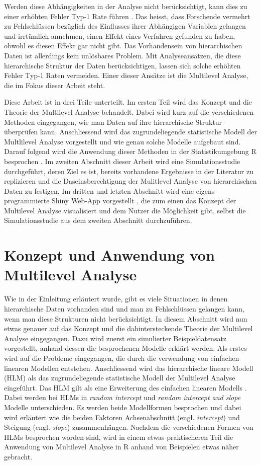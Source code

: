 \documentclass[12pt]{article}\usepackage[]{graphicx}\usepackage[]{color}
\begin{document}
Werden diese Abhängigkeiten in der Analyse nicht berücksichtigt, kann dies zu einer erhöhten Fehler Typ-1 Rate führen \citep{dorman2008effect, mcneish2014analyzing}. Das heisst, dass Forschende vermehrt zu Fehlschlüssen bezüglich des Einflusses ihrer Abhängigen Variablen gelangen und irrtümlich annehmen, einen Effekt eines Verfahren gefunden zu haben, obwohl es diesen Effekt gar nicht gibt. Das Vorhandensein von hierarchischen Daten ist allerdings kein unlösbares Problem. Mit Analyseansätzen, die diese hierarchische Struktur der Daten berücksichtigen, lassen sich solche erhöhten Fehler Typ-1 Raten vermeiden. Einer dieser Ansätze ist die Multilevel Analyse, die im Fokus dieser Arbeit steht.

Diese Arbeit ist in drei Teile unterteilt. Im ersten Teil wird das Konzept und die Theorie der Multilevel Analyse behandelt. Dabei wird kurz auf die verschiedenen Methoden eingegangen, wie man Daten auf ihre hierarchische Struktur überprüfen kann. Anschliessend wird das zugrundeliegende statistische Modell der Multlilevel Analyse vorgestellt und wie genau solche Modelle aufgebaut sind. Darauf folgend wird die Anwendung dieser Methoden in der Statistikumgebung R besprochen \citep{R}. Im zweiten Abschnitt dieser Arbeit wird eine Simulationsstudie durchgeführt, deren Ziel es ist, bereits vorhandene Ergebnisse in der Literatur zu replizieren und die Daseinsberechtigung der Mulitlevel Analyse von hierarchischen Daten zu festigen. Im dritten und letzten Abschnitt wird eine eigens programmierte Shiny Web-App vorgestellt \citep{shiny}, die zum einen das Konzept der Multilevel Analyse visualisiert und dem Nutzer die Möglichkeit gibt, selbst die Simulationsstudie aus dem zweiten Abschnitt durchzuführen. 

\section{Konzept und Anwendung von Multilevel Analyse}
Wie in der Einleitung erläutert wurde, gibt es viele Situationen in denen hierarchische Daten vorhanden sind und man zu Fehlschlüssen gelangen kann, wenn man diese Strukturen nicht berücksichtigt. In diesem Abschnitt wird nun etwas genauer auf das Konzept und die dahintersteckende Theorie der Multilevel Analyse eingegangen. Dazu wird zuerst ein simulierter Beispieldatensatz vorgestellt, anhand dessen die besprochenen Modelle erklärt werden. Als erstes wird auf die Probleme eingegangen, die durch die verwendung von einfachen linearen Modellen entstehen. Anschliessend wird das hierarchische lineare Modell (HLM) als das zugrundeliegende statistische Modell der Multilevel Analyse eingeführt. Das HLM gilt als eine Erweiterung des einfachen linearen Modells \cite{SnijdersTomA.B2012Ma:a}. Dabei werden bei HLMs in \textit{random intercept} und \textit{random intercept and slope} Modelle unterschieden. Es werden beide Modellformen besprochen und dabei wird erläutert wie die beiden Faktoren Achsenabschnitt (engl. \textit{intercept}) und Steigung (engl. \textit{slope}) zusammenhängen. Nachdem die verschiedenen Formen von HLMs besprochen worden sind, wird in einem etwas praktischeren Teil die Anwendung von Multilevel Analyse in R anhand von Beispielen etwas näher gebracht.
\end{document}
